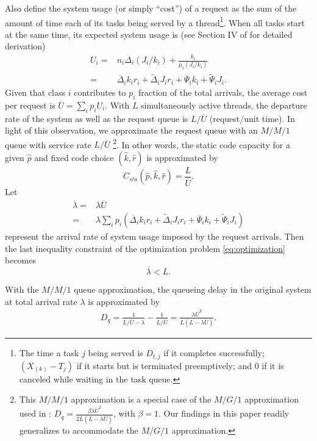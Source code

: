 \documentclass[journal]{IEEEtran}
\newcommand{\dimVec}{\hat{k}}
\newcommand{\compVec}{\hat{p}}
\newcommand{\rateVec}{\hat{r}}
\newcommand{\CapSta}{C_{sta}}
\newcommand{\normArrival}{\overline{\lambda}}
\newcommand{\aveUsage}{\overline{U}}
\newcommand{\fixedDelta}{\overline{\Delta}}
\newcommand{\linearDelta}{\widetilde{\Delta}}
\newcommand{\fixedExp}{\overline{\Psi}}
\newcommand{\linearExp}{\widetilde{\Psi}}
\begin{document}
Also define the system usage (or simply ``cost'') of a request as the sum of the amount of time each of its tasks being served by a thread\footnote{The time a task $j$ being served is $D_{t,j}$ if it completes successfully; $\left(X_{(k)}-T_j\right)$ if it starts but is terminated preemptively; and 0 if it is canceled while waiting in the task queue.}. When all tasks start at the same time, its expected system usage is (see Section IV of \cite{fastcloud} for detailed derivation)
\begin{align}
U_i =& n_i\Delta_i(J_i/k_i) + \frac{k_i}{\mu_i(J_i/k_i)}\nonumber\\
=& \fixedDelta_i k_i r_i + \linearDelta_i J_i r_i 
+ \fixedExp_i k_i + \linearExp_i J_i.
\end{align}
Given that class $i$ contributes to $p_i$ fraction of the total arrivals, the average cost per request is $\aveUsage = \sum_i p_i U_i$. With $L$ simultaneously active threads, the departure rate of the system as well as the request queue is  $L/\aveUsage$ (request/unit time). In light of this observation, we approximate the request queue with an $M/M/1$ queue with service rate $L/\aveUsage$
\footnote{This $M/M/1$ approximation is a special case of the $M/G/1$ approximation used in \cite{fastcloud}: $D_q = \frac{\beta\lambda \aveUsage^2}{2L(L-\lambda \aveUsage)}$, with $\beta = 1$. Our findings in this paper readily generalizes to accommodate the $M/G/1$ approximation.
}.
In other words, the static code capacity for a given $\compVec$ and fixed code choice $(\dimVec,\rateVec)$ is approximated by
\begin{equation}
\CapSta(\compVec,\dimVec,\rateVec) = \frac{L}{\aveUsage}.
\end{equation}
Let
\begin{align}
\normArrival =& \lambda \aveUsage 
\nonumber \\
=& \lambda \sum_i p_i (\fixedDelta_i k_i r_i + \linearDelta_i J_i r_i 
+ \fixedExp_i k_i + \linearExp_i J_i)
\end{align}
represent the arrival rate of system usage imposed by the request arrivals. Then the last inequality constraint of the optimization  problem \eqref{eq:optimization} becomes 
\begin{equation}
\normArrival < L.
\end{equation}


With the $M/M/1$ queue approximation, the queueing delay in the original system at total arrival rate $\lambda$ is approximated by
\begin{eqnarray}
D_q = \frac{1}{L/\aveUsage - \lambda} - \frac{1}{L/\aveUsage}
= \frac{\lambda \aveUsage^2}{L(L-\lambda \aveUsage)}.
\end{eqnarray}
\end{document}
